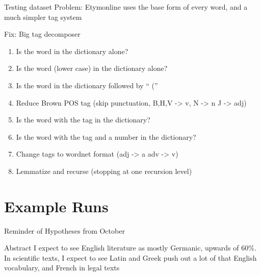 \documentclass[10pt]{beamer}
\begin{document}
\begin{frame}[fragile]{Testing dataset}
  Problem: Etymonline uses the base form of every word, and a much simpler tag system

  \pause

  Fix: Big tag decomposer

  \begin{enumerate}
    \item Is the word in the dictionary alone? 
    \item Is the word (lower case) in the dictionary alone? 
    \item Is the word in the dictionary followed by `` (''
    \item Reduce Brown POS tag (skip punctuation, B,H,V -> v, N -> n J -> adj)
    \item Is the word with the tag in the dictionary? 
    \item Is the word with the tag and a number in the dictionary? 
    \item Change tags to wordnet format (adj -> a adv -> v)
    \item Lemmatize and recurse (stopping at one recursion level)
  \end{enumerate}
  
\end{frame}

\section{Example Runs}

\begin{frame}[fragile]{Reminder of Hypotheses from October}

  \begin{block}{Abstract}
    I expect to see English literature as mostly Germanic, upwards of 60\%. In scientific texts, I expect to see Latin and Greek push out a lot of that English vocabulary, and French in legal texts
  \end{block}
  
\end{frame}
\end{document}
